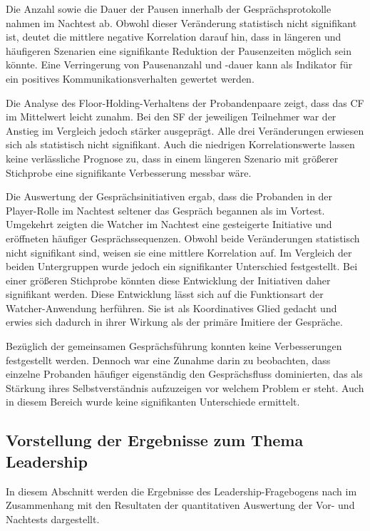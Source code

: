 Die Anzahl sowie die Dauer der Pausen innerhalb der Gesprächsprotokolle nahmen im Nachtest ab. Obwohl dieser Veränderung statistisch nicht signifikant ist, deutet die mittlere negative Korrelation darauf hin, dass in längeren und häufigeren Szenarien eine signifikante Reduktion der Pausenzeiten möglich sein könnte. Eine Verringerung von Pausenanzahl und -dauer kann als Indikator für ein positives Kommunikationsverhalten gewertet werden.

Die Analyse des Floor-Holding-Verhaltens der Probandenpaare zeigt, dass das \ac{CF} im Mittelwert leicht zunahm. Bei den \ac{SF} der jeweiligen Teilnehmer war der Anstieg im Vergleich jedoch stärker ausgeprägt. Alle drei Veränderungen erwiesen sich als statistisch nicht signifikant. Auch die niedrigen Korrelationswerte lassen keine verlässliche Prognose zu, dass in einem längeren Szenario mit größerer Stichprobe eine signifikante Verbesserung messbar wäre.

Die Auswertung der Gesprächsinitiativen ergab, dass die Probanden in der Player-Rolle im Nachtest seltener das Gespräch begannen als im Vortest. Umgekehrt zeigten die Watcher im Nachtest eine gesteigerte Initiative und eröffneten häufiger Gesprächssequenzen. Obwohl beide Veränderungen statistisch nicht signifikant sind, weisen sie eine mittlere Korrelation auf. Im Vergleich der beiden Untergruppen wurde jedoch ein signifikanter Unterschied festgestellt. Bei einer größeren Stichprobe könnten diese Entwicklung der Initiativen daher signifikant werden. Diese Entwicklung lässt sich auf die Funktionsart der Watcher-Anwendung herführen. Sie ist als Koordinatives Glied gedacht und erwies sich dadurch in ihrer Wirkung als der primäre Imitiere der Gespräche.

Bezüglich der gemeinsamen Gesprächsführung konnten keine Verbesserungen festgestellt werden. Dennoch war eine Zunahme darin zu beobachten, dass einzelne Probanden häufiger eigenständig den Gesprächsfluss dominierten, das als Stärkung ihres Selbstverständnis aufzuzeigen vor welchem Problem er steht. Auch in diesem Bereich wurde keine signifikanten Unterschiede ermittelt.


\subsection{Vorstellung der Ergebnisse zum Thema Leadership}

In diesem Abschnitt werden die Ergebnisse des Leadership-Fragebogens nach \cite{emmerich_game_2016} im Zusammenhang mit den Resultaten der quantitativen Auswertung der Vor- und Nachtests dargestellt.

